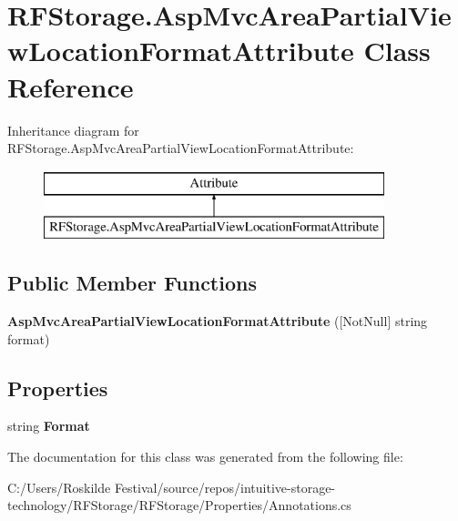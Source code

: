 \section{R\+F\+Storage.\+Asp\+Mvc\+Area\+Partial\+View\+Location\+Format\+Attribute Class Reference}
\label{class_r_f_storage_1_1_asp_mvc_area_partial_view_location_format_attribute}
Inheritance diagram for R\+F\+Storage.\+Asp\+Mvc\+Area\+Partial\+View\+Location\+Format\+Attribute\+:\begin{figure}[H]
\begin{center}
\leavevmode
\includegraphics[height=2.000000cm]{class_r_f_storage_1_1_asp_mvc_area_partial_view_location_format_attribute}
\end{center}
\end{figure}
\subsection*{Public Member Functions}
\begin{DoxyCompactItemize}
\item 
\mbox{\label{class_r_f_storage_1_1_asp_mvc_area_partial_view_location_format_attribute_a24338e90e79e11bd3738e44ebeff6c56}} 
{\bfseries Asp\+Mvc\+Area\+Partial\+View\+Location\+Format\+Attribute} ([Not\+Null] string format)
\end{DoxyCompactItemize}
\subsection*{Properties}
\begin{DoxyCompactItemize}
\item 
\mbox{\label{class_r_f_storage_1_1_asp_mvc_area_partial_view_location_format_attribute_a9dafa4a5a6d747ff1e48ebdbeb139f26}} 
string {\bfseries Format}\hspace{0.3cm}{\ttfamily  [get]}
\end{DoxyCompactItemize}


The documentation for this class was generated from the following file\+:\begin{DoxyCompactItemize}
\item 
C\+:/\+Users/\+Roskilde Festival/source/repos/intuitive-\/storage-\/technology/\+R\+F\+Storage/\+R\+F\+Storage/\+Properties/Annotations.\+cs\end{DoxyCompactItemize}

